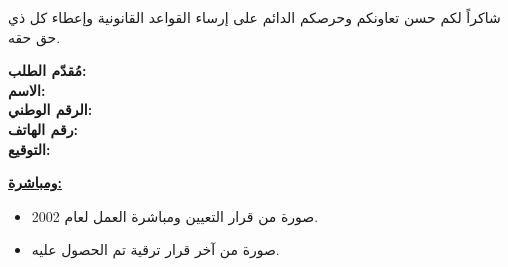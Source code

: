 \documentclass[12pt, a4paper]{article}
\begin{document}
\vspace{0.6cm}

شاكراً لكم حسن تعاونكم وحرصكم الدائم على إرساء القواعد القانونية وإعطاء كل ذي حق حقه.

\vspace{1.5cm}

\begin{flushleft} %
    \begin{minipage}{0.45\textwidth}
        \textbf{مُقدّم الطلب:} \\[0.3cm]
        \textbf{الاسم:} \dotfill \\[0.3cm]
        \textbf{الرقم الوطني:} \dotfill \\[0.3cm]
        \textbf{رقم الهاتف:} \dotfill \\[0.3cm]
        \textbf{التوقيع:} \dotfill
    \end{minipage}
\end{flushleft}

\vspace{1cm}

\textbf{\underline{ومباشرة:}}
\begin{itemize}
    \item صورة من قرار التعيين ومباشرة العمل لعام 2002.
    \item صورة من آخر قرار ترقية تم الحصول عليه.
\end{itemize}
\end{document}

